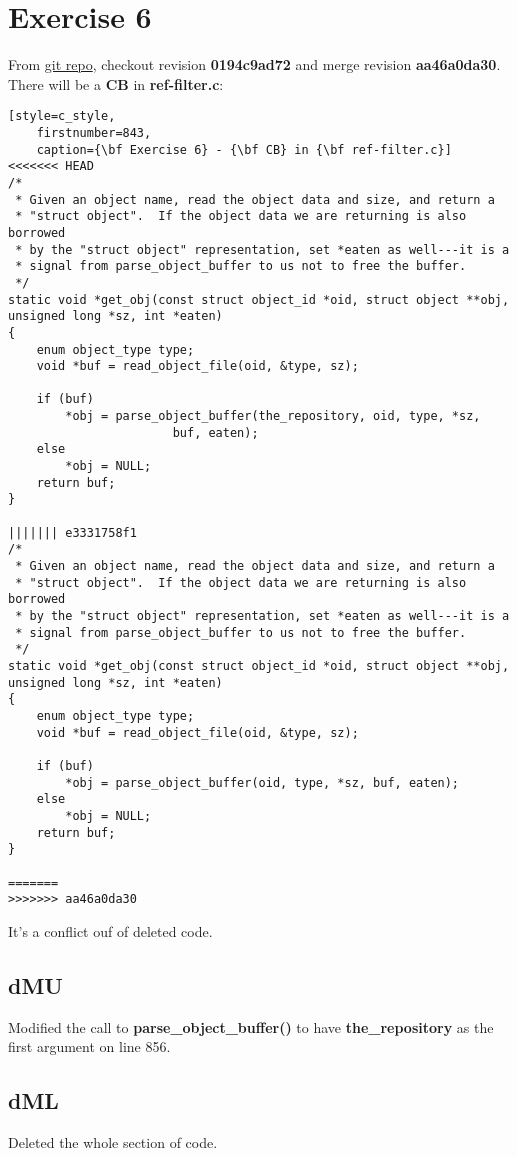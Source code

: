 \section{Exercise 6}
\label{exercise_06}

From \hyperref[git_repo]{git repo}, checkout revision {\bf 0194c9ad72} and merge revision {\bf aa46a0da30}. There will be
a {\bf CB} in {\bf ref-filter.c}:

\begin{lstlisting}[style=c_style,
	firstnumber=843,
	caption={\bf Exercise 6} - {\bf CB} in {\bf ref-filter.c}]
<<<<<<< HEAD
/*
 * Given an object name, read the object data and size, and return a
 * "struct object".  If the object data we are returning is also borrowed
 * by the "struct object" representation, set *eaten as well---it is a
 * signal from parse_object_buffer to us not to free the buffer.
 */
static void *get_obj(const struct object_id *oid, struct object **obj, unsigned long *sz, int *eaten)
{
	enum object_type type;
	void *buf = read_object_file(oid, &type, sz);

	if (buf)
		*obj = parse_object_buffer(the_repository, oid, type, *sz,
					   buf, eaten);
	else
		*obj = NULL;
	return buf;
}

||||||| e3331758f1
/*
 * Given an object name, read the object data and size, and return a
 * "struct object".  If the object data we are returning is also borrowed
 * by the "struct object" representation, set *eaten as well---it is a
 * signal from parse_object_buffer to us not to free the buffer.
 */
static void *get_obj(const struct object_id *oid, struct object **obj, unsigned long *sz, int *eaten)
{
	enum object_type type;
	void *buf = read_object_file(oid, &type, sz);

	if (buf)
		*obj = parse_object_buffer(oid, type, *sz, buf, eaten);
	else
		*obj = NULL;
	return buf;
}

=======
>>>>>>> aa46a0da30
\end{lstlisting}

It's a conflict ouf of deleted code.

\subsection*{dMU}
Modified the call to {\bf parse\_object\_buffer()} to have {\bf the\_repository} as the first argument on line 856.

\subsection*{dML}
Deleted the whole section of code.

